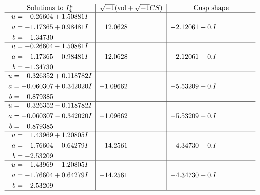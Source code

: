 \documentclass[1p]{elsarticle_modified}
\theoremstyle{definition}
\newcommand{\I}{\sqrt{-1}}
\begin{document}
$$\begin{array}{c|c|c}  
\text{Solutions to }I^u_{4}& \I (\text{vol} + \sqrt{-1}CS) & \text{Cusp shape}\\
 \hline 
\begin{aligned}
u &= -0.26604 + 1.50881 I \\
a &= -1.17365 + 0.98481 I \\
b &= -1.34730\phantom{ +0.000000I}\end{aligned}
 & \phantom{-}12.0628\phantom{ +0.000000I} & -2.12061 + 0. I\phantom{ +0.000000I} \\ \hline\begin{aligned}
u &= -0.26604 - 1.50881 I \\
a &= -1.17365 - 0.98481 I \\
b &= -1.34730\phantom{ +0.000000I}\end{aligned}
 & \phantom{-}12.0628\phantom{ +0.000000I} & -2.12061 + 0. I\phantom{ +0.000000I} \\ \hline\begin{aligned}
u &= \phantom{-}0.326352 + 0.118782 I \\
a &= -0.060307 + 0.342020 I \\
b &= \phantom{-}0.879385\phantom{ +0.000000I}\end{aligned}
 & -1.09662\phantom{ +0.000000I} & -5.53209 + 0. I\phantom{ +0.000000I} \\ \hline\begin{aligned}
u &= \phantom{-}0.326352 - 0.118782 I \\
a &= -0.060307 - 0.342020 I \\
b &= \phantom{-}0.879385\phantom{ +0.000000I}\end{aligned}
 & -1.09662\phantom{ +0.000000I} & -5.53209 + 0. I\phantom{ +0.000000I} \\ \hline\begin{aligned}
u &= \phantom{-}1.43969 + 1.20805 I \\
a &= -1.76604 - 0.64279 I \\
b &= -2.53209\phantom{ +0.000000I}\end{aligned}
 & -14.2561\phantom{ +0.000000I} & -4.34730 + 0. I\phantom{ +0.000000I} \\ \hline\begin{aligned}
u &= \phantom{-}1.43969 - 1.20805 I \\
a &= -1.76604 + 0.64279 I \\
b &= -2.53209\phantom{ +0.000000I}\end{aligned}
 & -14.2561\phantom{ +0.000000I} & -4.34730 + 0. I\phantom{ +0.000000I}\\
 \hline 
 \end{array}$$\newpage\newpage\renewcommand{\arraystretch}{1}
\end{document}
